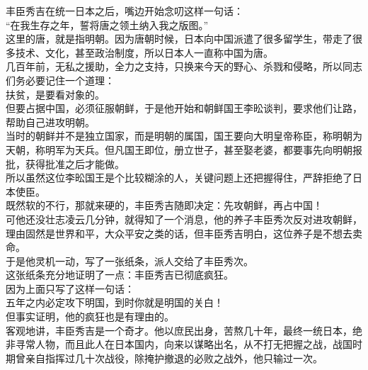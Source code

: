 \begin{multicols}{\theparacolNo}
丰臣秀吉在统一日本之后，嘴边开始念叨这样一句话：\\

“在我生存之年，誓将唐之领土纳入我之版图。”\\

这里的唐，就是指明朝。因为唐朝时候，日本向中国派遣了很多留学生，带走了很多技术、文化，甚至政治制度，所以日本人一直称中国为唐。\\

几百年前，无私之援助，全力之支持，只换来今天的野心、杀戮和侵略，所以同志们务必要记住一个道理：\\

扶贫，是要看对象的。\\

但要占据中国，必须征服朝鲜，于是他开始和朝鲜国王李昖谈判，要求他们让路，帮助自己进攻明朝。\\

当时的朝鲜并不是独立国家，而是明朝的属国，国王要向大明皇帝称臣，称明朝为天朝，称明军为天兵。但凡国王即位，册立世子，甚至娶老婆，都要事先向明朝报批，获得批准之后才能做。\\

所以虽然这位李昖国王是个比较糊涂的人，关键问题上还把握得住，严辞拒绝了日本使臣。\\

既然软的不行，那就来硬的，丰臣秀吉随即决定：先攻朝鲜，再占中国！\\

可他还没壮志凌云几分钟，就得知了一个消息，他的养子丰臣秀次反对进攻朝鲜，理由固然是世界和平，大众平安之类的话，但丰臣秀吉明白，这位养子是不想去卖命。\\

于是他灵机一动，写了一张纸条，派人交给了丰臣秀次。\\

这张纸条充分地证明了一点：丰臣秀吉已彻底疯狂。\\

因为上面只写了这样一句话：\\

五年之内必定攻下明国，到时你就是明国的关白！\\

但事实证明，他的疯狂也是有理由的。\\

客观地讲，丰臣秀吉是一个奇才。他以庶民出身，苦熬几十年，最终一统日本，绝非寻常人物，而且此人在日本国内，向来以谋略出名，从不打无把握之战，战国时期曾亲自指挥过几十次战役，除掩护撤退的必败之战外，他只输过一次。\\


\end{multicols}
